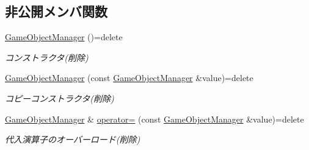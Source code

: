\subsection*{非公開メンバ関数}
\begin{DoxyCompactItemize}
\item 
\mbox{\hyperlink{class_game_object_manager_aa5693c4aefc135e5e85140427c781d3e}{Game\+Object\+Manager}} ()=delete
\begin{DoxyCompactList}\small\item\em コンストラクタ(削除) \end{DoxyCompactList}\item 
\mbox{\hyperlink{class_game_object_manager_a8a8f9ec94ecca948fc7ab63454398e36}{Game\+Object\+Manager}} (const \mbox{\hyperlink{class_game_object_manager}{Game\+Object\+Manager}} \&value)=delete
\begin{DoxyCompactList}\small\item\em コピーコンストラクタ(削除) \end{DoxyCompactList}\item 
\mbox{\hyperlink{class_game_object_manager}{Game\+Object\+Manager}} \& \mbox{\hyperlink{class_game_object_manager_af66275734b2098dc631fdb789d31fd52}{operator=}} (const \mbox{\hyperlink{class_game_object_manager}{Game\+Object\+Manager}} \&value)=delete
\begin{DoxyCompactList}\small\item\em 代入演算子のオーバーロード(削除) \end{DoxyCompactList}\end{DoxyCompactItemize}
